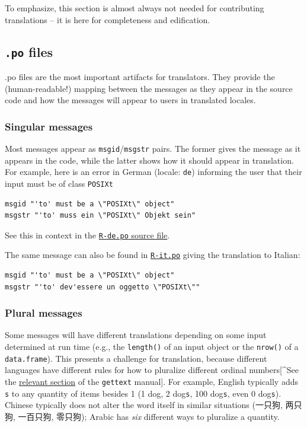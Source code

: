 \documentclass[
]{book}
\begin{document}
To emphasize, this section is almost always not needed for contributing
translations -- it is here for completeness and edification.

\subsection{\texorpdfstring{\texttt{.po} files}{.po files}}\label{po-files}

.po files are the most important artifacts for translators. They provide
the (human-readable!) mapping between the messages as they appear in the
source code and how the messages will appear to users in translated
locales.

\subsubsection{Singular messages}\label{singular-messages}

Most messages appear as \texttt{msgid}/\texttt{msgstr} pairs. The former gives the
message as it appears in the code, while the latter shows how it should
appear in translation. For example, here is an error in German (locale:
\texttt{de}) informing the user that their input must be of class \texttt{POSIXt}

\begin{verbatim}
msgid "'to' must be a \"POSIXt\" object"
msgstr "'to' muss ein \"POSIXt\" Objekt sein"
\end{verbatim}

See this in context in the \href{https://svn.r-project.org/R/trunk/src/library/base/po/R-de.po}{\texttt{R-de.po} source
file}.

The same message can also be found in
\href{https://svn.r-project.org/R/trunk/src/library/base/po/R-it.po}{\texttt{R-it.po}}
giving the translation to Italian:

\begin{verbatim}
msgid "'to' must be a \"POSIXt\" object"
msgstr "'to' dev'essere un oggetto \"POSIXt\""
\end{verbatim}

\subsubsection{Plural messages}\label{plural-messages}

Some messages will have different translations depending on some input
determined at run time (e.g., the \texttt{length()} of an input object or the
\texttt{nrow()} of a \texttt{data.frame}). This presents a challenge for translation,
because different languages have different rules for how to pluralize
different ordinal numbers{[}\^{}See the \href{https://www.gnu.org/software/gettext/manual/html_node/Plural-forms.html}{relevant
section}
of the \texttt{gettext} manual{]}. For example, English typically adds \texttt{s} to any
quantity of items besides 1 (1 dog, 2 dog\texttt{s}, 100 dog\texttt{s}, even 0
dog\texttt{s}). Chinese typically does not alter the word itself in similar
situations (一只狗, 两只狗, 一百只狗, 零只狗); Arabic has \emph{six}
different ways to pluralize a quantity.
\end{document}
